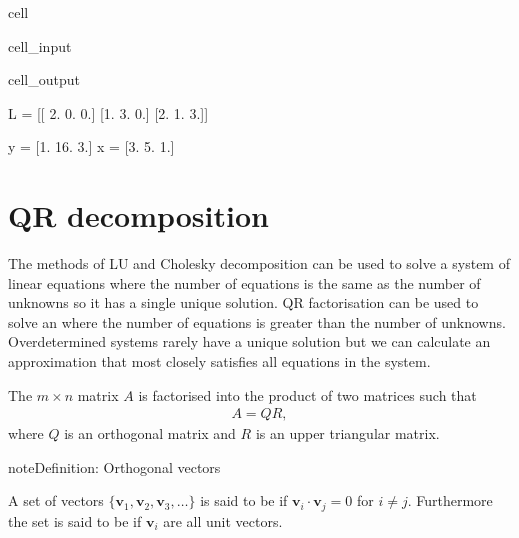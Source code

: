 \documentclass[letterpaper,10pt,english]{jupyterBook}
\begin{document}
\begin{sphinxuseclass}{cell}
\begin{sphinxVerbatimInput}
\begin{sphinxuseclass}{cell_input}
\end{sphinxuseclass}\end{sphinxVerbatimInput}
\begin{sphinxVerbatimOutput}

\begin{sphinxuseclass}{cell_output}
\begin{sphinxVerbatim}[commandchars=\\\{\}]
L = 
[[ 2.  0.  0.]
 [\PYGZhy{}1.  3.  0.]
 [\PYGZhy{}2.  1.  3.]]

y = [\PYGZhy{}1. 16.  3.]
x = [3. 5. 1.]
\end{sphinxVerbatim}

\end{sphinxuseclass}\end{sphinxVerbatimOutput}

\end{sphinxuseclass}
\sphinxstepscope


\section{QR decomposition}
\label{\detokenize{6_Direct_methods/6.4_QR_decomposition:qr-decomposition}}\label{\detokenize{6_Direct_methods/6.4_QR_decomposition:qr-section}}\label{\detokenize{6_Direct_methods/6.4_QR_decomposition::doc}}
\sphinxAtStartPar
The methods of LU and Cholesky decomposition can be used to solve a system of linear equations where the number of equations is the same as the number of unknowns so it has a single unique solution. QR factorisation can be used to solve an  where the number of equations is greater than the number of unknowns. Overdetermined systems rarely have a unique solution but we can calculate an approximation that most closely satisfies all equations in the system.

\sphinxAtStartPar
The \(m\times n\) matrix \(A\) is factorised into the product of two matrices such that
\begin{align*}
    A = QR,
\end{align*}
\sphinxAtStartPar
where \(Q\) is an orthogonal matrix and \(R\) is an upper triangular matrix.

\begin{sphinxadmonition}{note}{Definition: Orthogonal vectors}

\sphinxAtStartPar
A set of vectors \(\lbrace \mathbf{v}_1 ,\mathbf{v}_2 ,\mathbf{v}_3 ,\dots \rbrace\) is said to be  if \(\mathbf{v}_i \cdot \mathbf{v}_j =0\) for \(i\not= j\). Furthermore the set is said to be  if \(\mathbf{v}_i\) are all unit vectors.
\end{sphinxadmonition}
\end{document}
